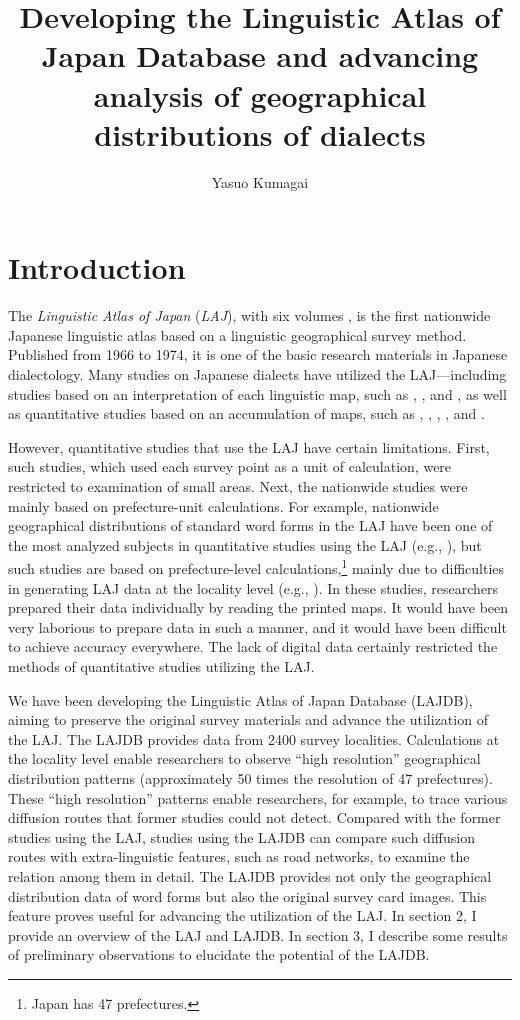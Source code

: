 \documentclass[output=paper]{LSP/langsci}
\author{Yasuo Kumagai\affiliation{National Institute for Japanese Language and Linguistics, NINJAL}}
\title{Developing the {L}inguistic {A}tlas of {J}apan {D}atabase and advancing analysis of geographical distributions of dialects}
\begin{document}
\section{Introduction}
The \textit{Linguistic Atlas of Japan} (\textit{LAJ}), with six volumes \citep{kokuritsu_kokugo_kenkyujo_nlri_nihon_1966-1}, is the first nationwide Japanese linguistic atlas based on a linguistic geographical survey method. Published from 1966 to 1974, it is one of the basic research materials in Japanese dialectology. Many studies on Japanese dialects have utilized the LAJ—including studies based on an interpretation of each linguistic map, such as \citet{sato_chiikishakai_1986}, \citet{tokugawa_hogenchirigaku_1993}, and \citet{kobayashi_hogengakuteki_2004}, as well as quantitative studies based on an accumulation of maps, such as \citet{takada_kotoba_1969}, \citet{hondo_gendai_1980}, \citet{kasai_hyojun_1981}, \citet{ichii_hogen_1993}, and \citet{inoue_keiryoteki_2001}.

However, quantitative studies that use the LAJ have certain limitations. First, such studies, which used each survey point as a unit of calculation, were restricted to examination of small areas. Next, the nationwide studies were mainly based on prefecture-unit calculations. For example, nationwide geographical distributions of standard word forms in the LAJ have been one of the most analyzed subjects in quantitative studies using the LAJ (e.g., \citealt{inoue_keiryoteki_2001}), but such studies are based on prefecture-level calculations,\footnote{Japan has 47 prefectures.} mainly due to difficulties in generating LAJ data at the locality level (e.g., \citealt[485, 498]{hondo_gendai_1980}). In these studies, researchers prepared their data individually by reading the printed maps. It would have been very laborious to prepare data in such a manner, and it would have been difficult to achieve accuracy everywhere. The lack of digital data certainly restricted the methods of quantitative studies utilizing the LAJ.

We have been developing the Linguistic Atlas of Japan Database (LAJDB), aiming to preserve the original survey materials and advance the utilization of the LAJ. The LAJDB provides data from 2400 survey localities. Calculations at the locality level enable researchers to observe “high resolution” geographical distribution patterns (approximately 50 times the resolution of 47 prefectures). These “high resolution” patterns enable researchers, for example, to trace various diffusion routes that former studies could not detect. Compared with the former studies using the LAJ, studies using the LAJDB can compare such diffusion routes with extra-linguistic features, such as road networks, to examine the relation among them in detail. The LAJDB provides not only the geographical distribution data of word forms but also the original survey card images. This feature proves useful for advancing the utilization of the LAJ. In section 2, I provide an overview of the LAJ and LAJDB. In section 3, I describe some results of preliminary observations to elucidate the potential of the LAJDB. 
\end{document}
